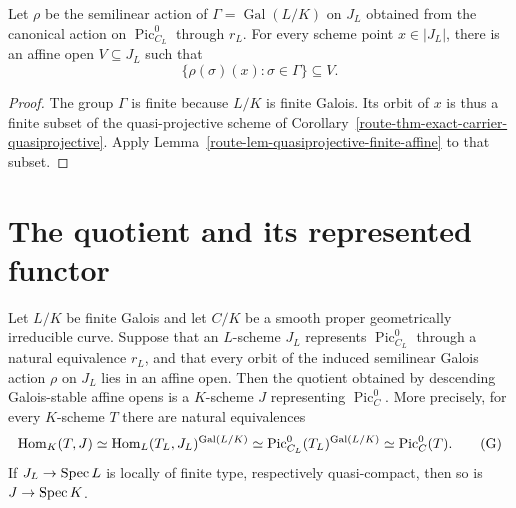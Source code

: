\begin{theorem}
  \label{route-thm-exact-carrier-orbits}
  \notready

  Let \(\rho\) be the semilinear action of
  \(\Gamma=\operatorname{Gal}(L/K)\) on \(J_L\) obtained from the
  canonical action on \(\operatorname{Pic}^0_{C_L}\) through \(r_L\).
  For every scheme point \(x\in|J_L|\), there is an affine open
  \(V\subseteq J_L\) such that
  \[
    \{\rho(\sigma)(x):\sigma\in\Gamma\}\subseteq V.
    \tag{OA}
  \]
\end{theorem}

\begin{proof}
  The group \(\Gamma\) is finite because \(L/K\) is finite Galois.
  Its orbit of \(x\) is thus a finite subset of the quasi-projective
  scheme of Corollary~\ref{route-thm-exact-carrier-quasiprojective}.
  Apply Lemma~\ref{route-lem-quasiprojective-finite-affine} to that subset.
\end{proof}

\section{The quotient and its represented functor}

\begin{theorem}
  \label{route-thm-finite-galois-descent}
  \leanok

  Let \(L/K\) be finite Galois and let \(C/K\) be a smooth proper
  geometrically irreducible curve. Suppose that an \(L\)-scheme \(J_L\)
  represents \(\operatorname{Pic}^0_{C_L}\) through a natural
  equivalence \(r_L\), and that every orbit of the induced semilinear
  Galois action \(\rho\) on \(J_L\) lies in an affine open. Then the
  quotient obtained by descending Galois-stable affine opens is a
  \(K\)-scheme \(J\) representing \(\operatorname{Pic}^0_C\). More
  precisely, for every \(K\)-scheme \(T\) there are natural equivalences
  \[
    \operatorname{Hom}_K(T,J)
      \simeq\operatorname{Hom}_L(T_L,J_L)^{\operatorname{Gal}(L/K)}
      \simeq\operatorname{Pic}^0_{C_L}(T_L)^{\operatorname{Gal}(L/K)}
      \simeq\operatorname{Pic}^0_C(T).
    \tag{G}
  \]
  If \(J_L\to\operatorname{Spec} L\) is locally of finite type, respectively
  quasi-compact, then so is \(J\to\operatorname{Spec} K\).
\end{theorem}

